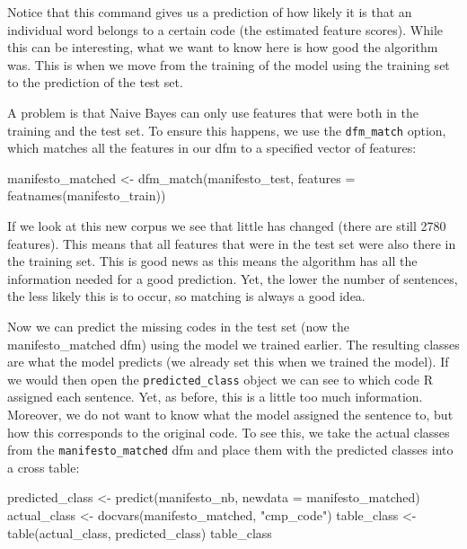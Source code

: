 \documentclass[
]{article}
\newenvironment{Shaded}{\begin{snugshade}}{\end{snugshade}}
\newcommand{\AttributeTok}[1]{\textcolor[rgb]{0.77,0.63,0.00}{#1}}
\newcommand{\FunctionTok}[1]{\textcolor[rgb]{0.00,0.00,0.00}{#1}}
\newcommand{\NormalTok}[1]{#1}
\newcommand{\OtherTok}[1]{\textcolor[rgb]{0.56,0.35,0.01}{#1}}
\newcommand{\StringTok}[1]{\textcolor[rgb]{0.31,0.60,0.02}{#1}}
\begin{document}
Notice that this command gives us a prediction of how likely it is that an individual word belongs to a certain code (the estimated feature scores). While this can be interesting, what we want to know here is how good the algorithm was. This is when we move from the training of the model using the training set to the prediction of the test set.

A problem is that Naive Bayes can only use features that were both in the training and the test set. To ensure this happens, we use the \texttt{dfm\_match} option, which matches all the features in our dfm to a specified vector of features:

\begin{Shaded}
\begin{Highlighting}[]
\NormalTok{manifesto\_matched }\OtherTok{\textless{}{-}} \FunctionTok{dfm\_match}\NormalTok{(manifesto\_test, }\AttributeTok{features =} \FunctionTok{featnames}\NormalTok{(manifesto\_train))}
\end{Highlighting}
\end{Shaded}

If we look at this new corpus we see that little has changed (there are still 2780 features). This means that all features that were in the test set were also there in the training set. This is good news as this means the algorithm has all the information needed for a good prediction. Yet, the lower the number of sentences, the less likely this is to occur, so matching is always a good idea.

Now we can predict the missing codes in the test set (now the manifesto\_matched dfm) using the model we trained earlier. The resulting classes are what the model predicts (we already set this when we trained the model). If we would then open the \texttt{predicted\_class} object we can see to which code R assigned each sentence. Yet, as before, this is a little too much information. Moreover, we do not want to know what the model assigned the sentence to, but how this corresponds to the original code. To see this, we take the actual classes from the \texttt{manifesto\_matched} dfm and place them with the predicted classes into a cross table:

\begin{Shaded}
\begin{Highlighting}[]
\NormalTok{predicted\_class }\OtherTok{\textless{}{-}} \FunctionTok{predict}\NormalTok{(manifesto\_nb, }\AttributeTok{newdata =}\NormalTok{ manifesto\_matched)}
\NormalTok{actual\_class }\OtherTok{\textless{}{-}} \FunctionTok{docvars}\NormalTok{(manifesto\_matched, }\StringTok{"cmp\_code"}\NormalTok{)}
\NormalTok{table\_class }\OtherTok{\textless{}{-}} \FunctionTok{table}\NormalTok{(actual\_class, predicted\_class)}
\NormalTok{table\_class}
\end{Highlighting}
\end{Shaded}
\end{document}
